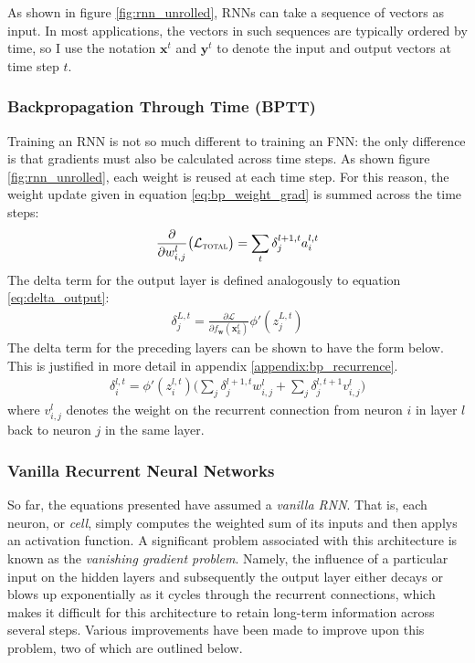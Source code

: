 \documentclass[a4paper, 12pt]{report}
\newcommand{\tit}[1]{\textit{#1}}
\begin{document}
As shown in figure \ref{fig:rnn_unrolled}, RNNs can take a sequence of vectors as input. In most applications, the vectors in such sequences are typically ordered by time, so I use the notation $\mathbf{x}^t$ and $\mathbf{y}^t$ to denote the input and output vectors at time step $t$.

\subsubsection{Backpropagation Through Time (BPTT)}

Training an RNN is not so much different to training an FNN: the only difference is that gradients must also be calculated across time steps. As shown figure \ref{fig:rnn_unrolled}, each weight is reused at each time step. For this reason, the weight update given in equation \ref{eq:bp_weight_grad} is summed across the time steps:
\begin{gather*}
	\frac{\partial}{\partial w_{i,j}^l} \big( \mathcal{L}_{\text{\scshape total}} \big) = \sum_t \delta_j^{l+1,t} a_i^{l,t}
\end{gather*}
The delta term for the output layer is defined analogously to equation \ref{eq:delta_output}:
\begin{gather} \label{eq:delta_output}
	\delta_j^{L,t} = \frac{\partial \mathcal{L}}{\partial f_{\mathbf{w}}(\mathbf{x}_k^t)} \phi'(z_j^{L,t})
\end{gather}
The delta term for the preceding layers can be shown to have the form below. This is justified in more detail in appendix \ref{appendix:bp_recurrence}.
\begin{gather} \label{eq:delta_hidden}
	\delta_i^{l,t} = \phi'(z_i^{l,t}) \big( \sum_j \delta_j^{l+1,t} w_{i,j}^l + \sum_j \delta_j^{l,t+1} v_{i,j}^l \big)
\end{gather}
where $v_{i,j}^l$ denotes the weight on the recurrent connection from neuron $i$ in layer $l$ back to neuron $j$ in the same layer.

\subsubsection{Vanilla Recurrent Neural Networks}
So far, the equations presented have assumed a \tit{vanilla RNN}. That is, each neuron, or \tit{cell}, simply computes the weighted sum of its inputs and then applys an activation function. A significant problem associated with this architecture is known as the \tit{vanishing gradient problem}. Namely, the influence of a particular input on the hidden layers and subsequently the output layer either decays or blows up exponentially as it cycles through the recurrent connections, which makes it difficult for this architecture to retain long-term information across several steps. Various improvements have been made to improve upon this problem, two of which are outlined below.
\end{document}
